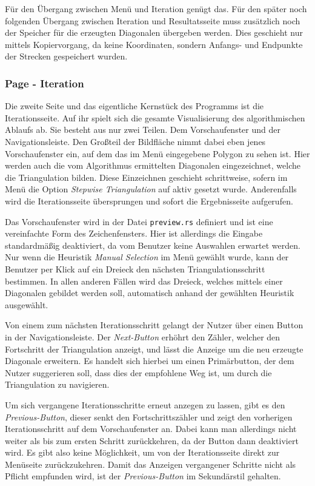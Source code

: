 Für den Übergang zwischen Menü und Iteration genügt das. Für den später noch folgenden Übergang zwischen Iteration und Resultatsseite muss zusätzlich noch der Speicher für die erzeugten Diagonalen übergeben werden.
Dies geschieht nur mittels Kopiervorgang, da keine Koordinaten, sondern Anfangs- und Endpunkte der Strecken gespeichert wurden.

\subsubsection{Page - Iteration}

Die zweite Seite und das eigentliche Kernstück des Programms ist die Iterationsseite. Auf ihr spielt sich die gesamte Visualisierung des algorithmischen Ablaufs ab.
Sie besteht aus nur zwei Teilen. Dem Vorschaufenster und der Navigationsleiste. Den Großteil der Bildfläche nimmt dabei eben jenes Vorschaufenster ein, auf dem das im Menü eingegebene 
Polygon zu sehen ist. Hier werden auch die vom Algorithmus ermittelten Diagonalen eingezeichnet, welche die Triangulation bilden. Diese Einzeichnen geschieht schrittweise, sofern 
im Menü die Option \emph{Stepwise Triangulation} auf aktiv gesetzt wurde. Anderenfalls wird die Iterationsseite übersprungen und sofort die Ergebnisseite aufgerufen.

Das Vorschaufenster wird in der Datei \lstinline{preview.rs} definiert und ist eine vereinfachte Form des Zeichenfensters. Hier ist allerdings die Eingabe standardmäßig deaktiviert, da vom Benutzer keine 
Auswahlen erwartet werden. Nur wenn die Heuristik \emph{Manual Selection} im Menü gewählt wurde, kann der Benutzer per Klick auf ein Dreieck den nächsten Triangulationsschritt bestimmen.
In allen anderen Fällen wird das Dreieck, welches mittels einer Diagonalen gebildet werden soll, automatisch anhand der gewählten Heuristik ausgewählt.

Von einem zum nächsten Iterationsschritt gelangt der Nutzer über einen Button in der Navigationsleiste. Der \emph{Next-Button} erhöhrt den Zähler, welcher den Fortschritt der Triangulation anzeigt, 
und lässt die Anzeige um die neu erzeugte Diagonale erweitern. Es handelt sich hierbei um einen Primärbutton, der dem Nutzer suggerieren soll, dass dies der empfohlene Weg ist, um durch die Triangulation zu navigieren.

Um sich vergangene Iterationsschritte erneut anzegen zu lassen, gibt es den \emph{Previous-Button}, dieser senkt den Fortschrittszähler und zeigt den vorherigen Iterationsschritt auf dem Vorschaufenster an.
Dabei kann man allerdings nicht weiter als bis zum ersten Schritt zurückkehren, da der Button dann deaktiviert wird. Es gibt also keine Möglichkeit, um von der Iterationsseite direkt zur Menüseite zurückzukehren.
Damit das Anzeigen vergangener Schritte nicht als Pflicht empfunden wird, ist der \emph{Previous-Button} im Sekundärstil gehalten.

